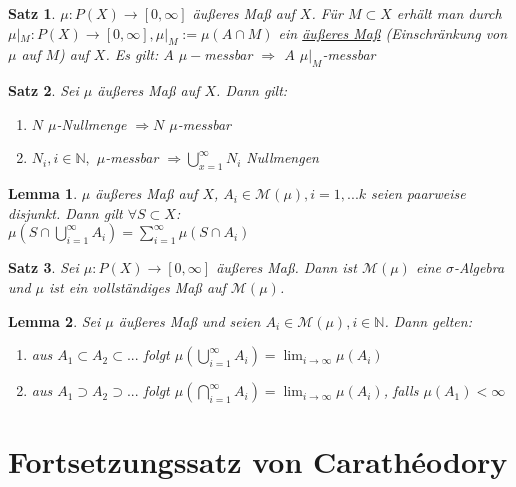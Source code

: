 \documentclass[11pt]{memoir}
\theoremstyle{break}
\newtheorem{Lemma}{Lemma}[chapter]
\newtheorem{Satz}{Satz}[chapter]
\begin{document}
\begin{Satz}
$\mu: P(X) \rightarrow [0, \infty]$ äußeres Maß auf $X$. Für $M \subset X$ erhält man durch $\mu|_M : P(X) \rightarrow [0, \infty], \mu|_M := \mu(A \cap M)$ ein \underline{äußeres Maß} (Einschränkung von $\mu$ auf $M$) auf $X$. Es gilt: $A$ $ \mu-$messbar $\Rightarrow$  $A$ $ \mu|_M $-messbar
\end{Satz}

\begin{Satz}
Sei $\mu$ äußeres Maß auf $X$. Dann gilt:
\begin{enumerate}
	\item $N$ $\mu$-Nullmenge $\Rightarrow N$ $\mu$-messbar 
	\item $N_i, i \in \mathbb N,$ $\mu$-messbar $\Rightarrow \bigcup\limits_{x=1}^\infty N_i$ Nullmengen
\end{enumerate}
\end{Satz}


\begin{Lemma}
$\mu$ äußeres Maß auf $X$, $A_i \in \mathscr M(\mu), i = 1, ... k$ seien paarweise disjunkt. Dann gilt $\forall S \subset X$: \\
$\mu\left(S \cap \bigcup\limits_{i=1}^\infty A_i\right) = \sum\limits_{i=1}^\infty \mu(S \cap A_i)$
\end{Lemma}

\begin{Satz}
Sei $\mu: P(X) \rightarrow [0, \infty]$ äußeres Maß. Dann ist $\mathscr M(\mu)$ eine $\sigma$-Algebra und $\mu$ ist ein vollständiges Maß auf $\mathscr M(\mu)$.
\end{Satz}

\begin{Lemma}
Sei $\mu$ äußeres Maß und seien $A_i \in \mathscr M(\mu), i \in \mathbb N$. Dann gelten:
\begin{enumerate}
	\item aus $A_1 \subset A_2 \subset ...$ folgt $\mu\left(\bigcup\limits_{i=1}^\infty A_i\right) = \lim_{i \rightarrow \infty} \mu(A_i)$ 
	\item aus $A_1 \supset A_2 \supset ...$ folgt $\mu\left(\bigcap\limits_{i=1}^\infty A_i\right) = \lim_{i \rightarrow \infty} \mu(A_i)$, falls $\mu(A_1) \less \infty$
\end{enumerate}
\end{Lemma}


\section{Fortsetzungssatz von Carathéodory}
\end{document}
